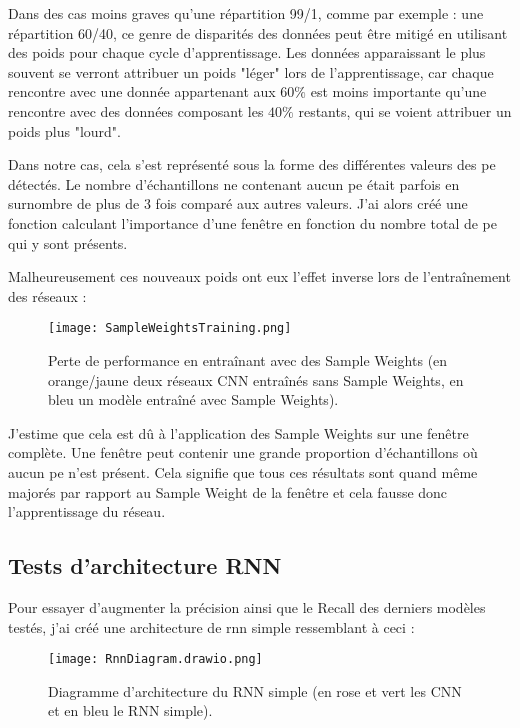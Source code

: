 Dans des cas moins graves qu'une répartition 99/1, comme par exemple : une répartition 60/40, ce genre de disparités
des données peut être mitigé en utilisant des poids pour chaque cycle d'apprentissage. Les données apparaissant le plus souvent 
se verront attribuer un poids "léger" lors de l'apprentissage, car chaque rencontre avec une donnée appartenant 
aux $60\%$ est moins importante qu'une rencontre avec des données composant les $40\%$ restants, qui se voient attribuer un poids plus "lourd".

Dans notre cas, cela s'est représenté sous la forme des différentes valeurs des \gls{pe} détectés. 
Le nombre d'échantillons ne contenant aucun \gls{pe} était parfois en surnombre de plus de 3 fois comparé aux autres valeurs. 
J'ai alors créé une fonction calculant l'importance d'une fenêtre en fonction du nombre total de \gls{pe} qui y sont présents.

Malheureusement ces nouveaux poids ont eux l'effet inverse lors de l'entraînement des réseaux :
\begin{figure}[tbph!]
	\centering
	\texttt{[image: SampleWeightsTraining.png]}
	\caption[Perte de performance en entraînant avec des Sample Weights]{Perte de performance en entraînant avec des Sample Weights (en orange/jaune deux réseaux CNN entraînés sans Sample Weights, en bleu un modèle entraîné avec Sample Weights).}
\end{figure}

J'estime que cela est dû à l'application des Sample Weights sur une fenêtre complète. Une fenêtre peut contenir 
une grande proportion d'échantillons où aucun \gls{pe} n'est présent. Cela signifie que tous ces résultats sont 
quand même majorés par rapport au Sample Weight de la fenêtre et cela fausse donc l'apprentissage du réseau.

\subsection{Tests d'architecture RNN}
Pour essayer d'augmenter la précision ainsi que le Recall des derniers modèles testés, j'ai créé une architecture de \gls{rnn} simple ressemblant à ceci :

\begin{figure}[tbph!]
	\centering
	\texttt{[image: RnnDiagram.drawio.png]}
	\caption[Diagramme d'architecture du RNN simple]{Diagramme d'architecture du RNN simple (en rose et vert les CNN et en bleu le RNN simple).}
\end{figure}

